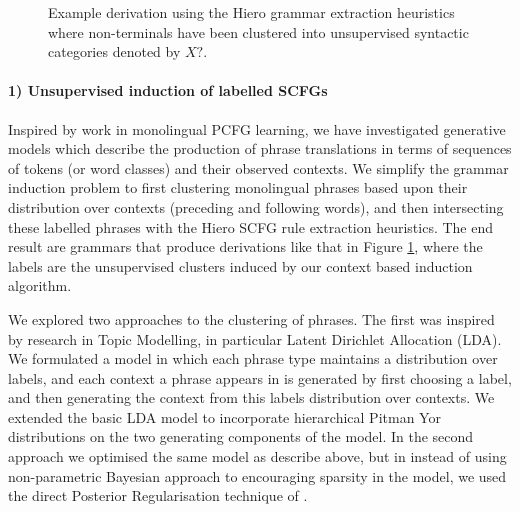 \begin{figure}
  \centering
\caption{Example derivation using the Hiero grammar extraction heuristics where non-terminals have been clustered into unsupervised syntactic categories denoted by $X?$.}
\label{fig:intro_labelled_hiero}
\end{figure}


\paragraph{1) Unsupervised induction of labelled SCFGs}
Inspired by work in monolingual PCFG learning, we have investigated generative models which describe the production of phrase translations in terms of sequences of tokens (or word classes) and their observed contexts.
We simplify the grammar induction problem to first clustering monolingual phrases based upon their distribution over contexts (preceding and following words), and then intersecting these labelled phrases with the Hiero \cite{chiang07hierarchical} SCFG rule extraction heuristics. 
The end result are grammars that produce derivations like that in Figure \ref{fig:intro_labelled_hiero}, where the labels are the unsupervised clusters induced by our context based induction algorithm.

We explored two approaches to the clustering of phrases.
The first was inspired by research in Topic Modelling, in particular Latent Dirichlet Allocation (LDA).
We formulated a model in which each phrase type maintains a distribution over labels, and each context a phrase appears in is generated by first choosing a label, and then generating the context from this labels distribution over contexts.
We extended the basic LDA model to incorporate hierarchical Pitman Yor distributions on the two generating components of the model.
In the second approach we optimised the same model as describe above, but in instead of using non-parametric Bayesian approach to encouraging sparsity in the model, we used the direct Posterior Regularisation technique of \cite{someone}. 


